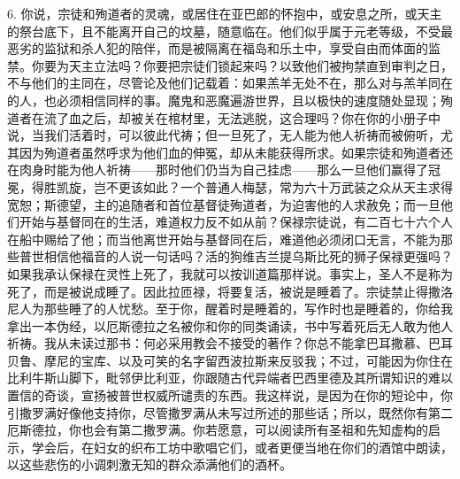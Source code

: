 6. 你说，宗徒和殉道者的灵魂，或居住在亚巴郎的怀抱中，或安息之所，或天主的祭台底下，且不能离开自己的坟墓，随意临在。他们似乎属于元老等级，不受最恶劣的监狱和杀人犯的陪伴，而是被隔离在福岛和乐土中，享受自由而体面的监禁。你要为天主立法吗？你要把宗徒们锁起来吗？以致他们被拘禁直到审判之日，不与他们的主同在，尽管论及他们记载着：如果羔羊无处不在，那么对与羔羊同在的人，也必须相信同样的事。魔鬼和恶魔遍游世界，且以极快的速度随处显现；殉道者在流了血之后，却被关在棺材里，无法逃脱，这合理吗？你在你的小册子中说，当我们活着时，可以彼此代祷；但一旦死了，无人能为他人祈祷而被俯听，尤其因为殉道者虽然呼求为他们血的伸冤，却从未能获得所求。如果宗徒和殉道者还在肉身时能为他人祈祷——那时他们仍当为自己挂虑——那么一旦他们赢得了冠冕，得胜凯旋，岂不更该如此？一个普通人梅瑟，常为六十万武装之众从天主求得宽恕；斯德望，主的追随者和首位基督徒殉道者，为迫害他的人求赦免；而一旦他们开始与基督同在的生活，难道权力反不如从前？保禄宗徒说，有二百七十六个人在船中赐给了他；而当他离世开始与基督同在后，难道他必须闭口无言，不能为那些普世相信他福音的人说一句话吗？活的狗维吉兰提乌斯比死的狮子保禄更强吗？如果我承认保禄在灵性上死了，我就可以按训道篇那样说。事实上，圣人不是称为死了，而是被说成睡了。因此拉匝禄，将要复活，被说是睡着了。宗徒禁止得撒洛尼人为那些睡了的人忧愁。至于你，醒着时是睡着的，写作时也是睡着的，你给我拿出一本伪经，以厄斯德拉之名被你和你的同类诵读，书中写着死后无人敢为他人祈祷。我从未读过那书：何必采用教会不接受的著作？你总不能拿巴耳撒慕、巴耳贝鲁、摩尼的宝库、以及可笑的名字留西波拉斯来反驳我；不过，可能因为你住在比利牛斯山脚下，毗邻伊比利亚，你跟随古代异端者巴西里德及其所谓知识的难以置信的奇谈，宣扬被普世权威所谴责的东西。我这样说，是因为在你的短论中，你引撒罗满好像他支持你，尽管撒罗满从未写过所述的那些话；所以，既然你有第二厄斯德拉，你也会有第二撒罗满。你若愿意，可以阅读所有圣祖和先知虚构的启示，学会后，在妇女的织布工坊中歌唱它们，或者更便当地在你们的酒馆中朗读，以这些悲伤的小调刺激无知的群众添满他们的酒杯。\par

